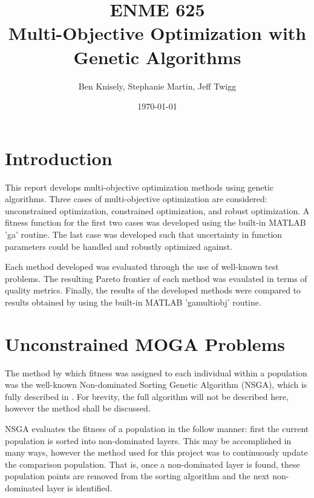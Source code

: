 \documentclass{article}
\title{ENME 625 \\
Multi-Objective Optimization with Genetic Algorithms}
\author{Ben Knisely, Stephanie Martin, Jeff Twigg}
\date{ \today }
\begin{document}
 
\maketitle

\newpage
 
\tableofcontents
 
\newpage 
 
\section{Introduction}
 
This report develops multi-objective optimization methods using genetic algorithms. Three cases of multi-objective optimization are considered: unconstrained optimization, constrained optimization, and robust optimization. A fitness function for the first two cases was developed using the built-in MATLAB 'ga' routine. The last case was developed such that uncertainty in function parameters could be handled and robustly optimized against.

\noindent Each method developed was evaluated through the use of well-known test problems. The resulting Pareto frontier of each method was evaulated in terms of quality metrics. Finally, the results of the developed methods were compared to results obtained by using the built-in MATLAB 'gamultiobj' routine.
 

\section{Unconstrained MOGA Problems}
The method by which fitness was assigned to each individual within a population was the well-known Non-dominated Sorting Genetic Algorithm (NSGA), which is fully described in \cite{deb2001multi}. For brevity, the full algorithm will not be described here, however the method shall be discussed. \newline

\noindent NSGA evaluates the fitness of a population in the follow manner: first the current population is sorted into non-dominated layers. This may be accomplished in many ways, however the method used for this project was to continuously update the comparison population. That is, once a non-dominated layer is found, these population points are removed from the sorting algorithm and the next non-dominated layer is identified.  \newline
\end{document}
